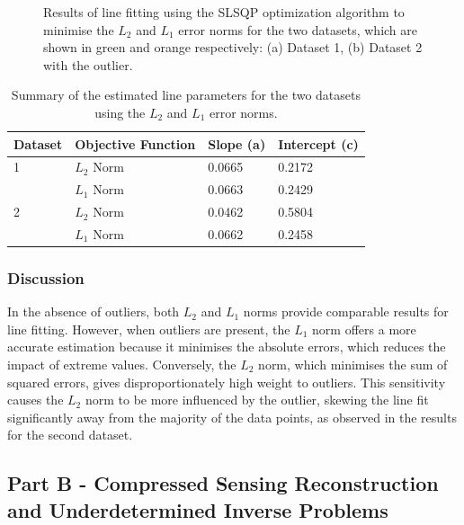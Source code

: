\documentclass[11pt]{article}
\begin{document}
\begin{figure}[H]
\begin{subfigure}{.45\textwidth}
        \caption{}
        \label{fig:line_fit_2}
    \end{subfigure}%
    \caption{Results of line fitting using the SLSQP optimization algorithm to minimise the \(L_2\) and \(L_1\) error norms for the two datasets, which are shown in green and orange respectively: (a) Dataset 1, (b) Dataset 2 with the outlier.}
    \label{fig:line_fitting_results}
\end{figure}

\begin{table}[H]
    \centering
    \begin{tabular}{@{}llll@{}}
    \toprule
    \textbf{Dataset} & \textbf{Objective Function} & \textbf{Slope (a)} & \textbf{Intercept (c)} \\ \midrule
    1               & \(L_2\) Norm                & 0.0665             & 0.2172                 \\
                    & \(L_1\) Norm                & 0.0663             & 0.2429                 \\ \midrule
    2               & \(L_2\) Norm                & 0.0462             & 0.5804                 \\
                    & \(L_1\) Norm                & 0.0662             & 0.2458                 \\ \bottomrule
    \end{tabular}
    \caption{Summary of the estimated line parameters for the two datasets using the \(L_2\) and \(L_1\) error norms.}
    \label{tab:line_fitting_results}
\end{table}

\subsubsection{Discussion}
In the absence of outliers, both \(L_2\) and \(L_1\) norms provide comparable results for line fitting. However, when outliers are present, the \(L_1\) norm offers a more accurate estimation because it minimises the absolute errors, which reduces the impact of extreme values. Conversely, the \(L_2\) norm, which minimises the sum of squared errors, gives disproportionately high weight to outliers. This sensitivity causes the \(L_2\) norm to be more influenced by the outlier, skewing the line fit significantly away from the majority of the data points, as observed in the results for the second dataset.



\subsection{Part B - Compressed Sensing Reconstruction and Underdetermined Inverse Problems}
\end{document}
